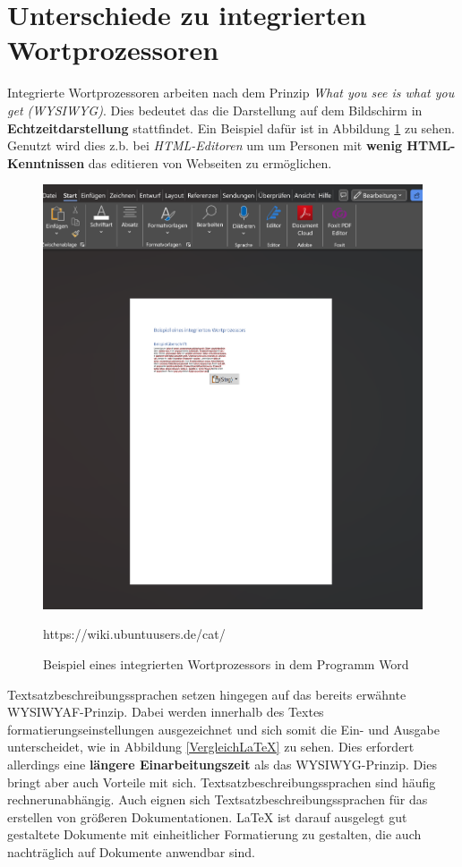 \section{Unterschiede zu integrierten Wortprozessoren}
Integrierte Wortprozessoren arbeiten nach dem Prinzip \textit{What you see is what you get (WYSIWYG)}. Dies bedeutet das die Darstellung auf dem Bildschirm in \textbf{Echtzeitdarstellung} stattfindet. Ein Beispiel dafür ist in Abbildung \ref{Wortprozessor} zu sehen. Genutzt wird dies z.b. bei \textit{HTML-Editoren} um um Personen mit \textbf{wenig HTML-Kenntnissen} das editieren von Webseiten zu ermöglichen.

\begin{figure}[h]
	\centering
	\includegraphics[scale=0.5]{Images/Wortprozessor.png}
	\caption{Beispiel eines integrierten Wortprozessors in dem Programm Word}
	\label{Wortprozessor}https://wiki.ubuntuusers.de/cat/
\end{figure}

Textsatzbeschreibungssprachen setzen hingegen auf das bereits erwähnte WYSIWYAF-Prinzip. Dabei werden innerhalb des Textes formatierungseinstellungen ausgezeichnet und sich somit die Ein- und Ausgabe unterscheidet, wie in Abbildung \ref{VergleichLaTeX} zu sehen. Dies erfordert allerdings eine \textbf{längere Einarbeitungszeit} als das WYSIWYG-Prinzip.
Dies bringt aber auch Vorteile mit sich. Textsatzbeschreibungssprachen sind häufig rechnerunabhängig. Auch eignen sich Textsatzbeschreibungssprachen für das erstellen von größeren Dokumentationen. LaTeX ist darauf ausgelegt gut gestaltete Dokumente mit einheitlicher Formatierung zu gestalten, die auch nachträglich auf Dokumente anwendbar sind. 

